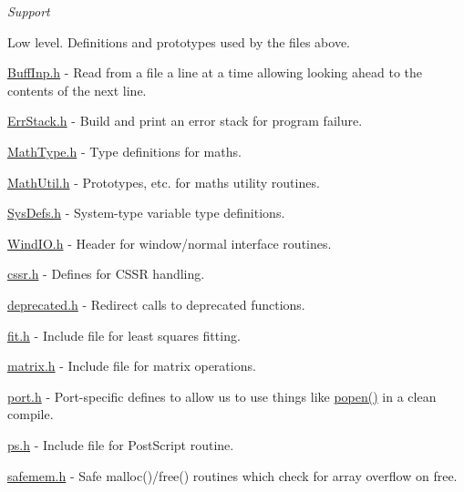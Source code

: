 {\itshape Support}

Low level. Definitions and prototypes used by the files above.


\begin{DoxyItemize}
\item \hyperlink{_buff_inp_8h}{Buff\-Inp.\-h} -\/ Read from a file a line at a time allowing looking ahead to the contents of the next line.
\item \hyperlink{_err_stack_8h}{Err\-Stack.\-h} -\/ Build and print an error stack for program failure.
\item \hyperlink{_math_type_8h}{Math\-Type.\-h} -\/ Type definitions for maths.
\item \hyperlink{_math_util_8h}{Math\-Util.\-h} -\/ Prototypes, etc. for maths utility routines.
\item \hyperlink{_sys_defs_8h}{Sys\-Defs.\-h} -\/ System-\/type variable type definitions.
\item \hyperlink{_wind_i_o_8h}{Wind\-I\-O.\-h} -\/ Header for window/normal interface routines.
\item \hyperlink{cssr_8h}{cssr.\-h} -\/ Defines for C\-S\-S\-R handling.
\item \hyperlink{deprecated_8h}{deprecated.\-h} -\/ Redirect calls to deprecated functions.
\item \hyperlink{fit_8h}{fit.\-h} -\/ Include file for least squares fitting.
\item \hyperlink{matrix_8h}{matrix.\-h} -\/ Include file for matrix operations.
\item \hyperlink{port_8h}{port.\-h} -\/ Port-\/specific defines to allow us to use things like \hyperlink{openorpipe_8c_af78772fbd79937a93ce4a787b011a520}{popen()} in a clean compile.
\item \hyperlink{ps_8h}{ps.\-h} -\/ Include file for Post\-Script routine.
\item \hyperlink{safemem_8h}{safemem.\-h} -\/ Safe malloc()/free() routines which check for array overflow on free. 
\end{DoxyItemize}